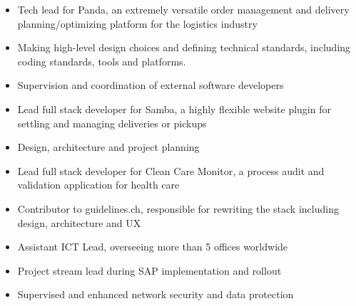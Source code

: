 \documentclass[9pt,a4paper]{altacv}
\begin{document}

\begin{fullwidth}
\makecvheader
\end{fullwidth}

%
\makebox[0pt][l]{%
  \hspace{-4cm}
  \raisebox{-\totalheight}[0pt][0pt]{%
   {\color{background}\fontsize{250}{48}\faRocket}
}}%
\begin{itemize}
\item Tech lead for Panda, an extremely versatile order management and delivery planning/optimizing platform for the logistics industry
\item Making high-level design choices and defining technical standards, including coding standards, tools and platforms.
\item Supervision and coordination of external software developers
\item Lead full stack developer for Samba, a highly flexible website plugin for settling and managing deliveries or pickups
\end{itemize}

\divider

\begin{itemize}
\item Design, architecture and project planning
\item Lead full stack developer for Clean Care Monitor, a process audit and validation application for health care
\item Contributor to guidelines.ch, responsible for rewriting the stack including design, architecture and UX
\end{itemize}

\divider

\begin{itemize}
\item Assistant ICT Lead, overseeing more than 5 offices worldwide
\item Project stream lead during SAP implementation and rollout
\item Supervised and enhanced network security and data protection
\end{itemize}
\end{document}
